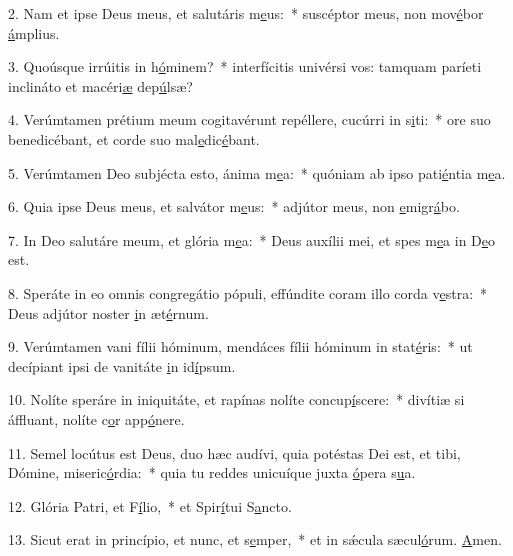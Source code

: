 2. Nam et ipse Deus meus, et salutáris m\uline{e}us:~* suscéptor meus, non mov\uline{é}bor \uline{á}mplius.\par 
3. Quoúsque irrúitis in h\uline{ó}minem?~* interfícitis univérsi vos: tamquam paríeti inclináto et macéri\uline{æ} dep\uline{ú}lsæ?\par 
4. Verúmtamen prétium meum cogitavérunt repéllere, cucúrri in s\uline{i}ti:~* ore suo benedicébant, et corde suo mal\uline{e}dic\uline{é}bant.\par 
5. Verúmtamen Deo subjécta esto, ánima m\uline{e}a:~* quóniam ab ipso pati\uline{é}ntia m\uline{e}a.\par 
6. Quia ipse Deus meus, et salvátor m\uline{e}us:~* adjútor meus, non \uline{e}migr\uline{á}bo.\par 
7. In Deo salutáre meum, et glória m\uline{e}a:~* Deus auxílii mei, et spes m\uline{e}a in D\uline{e}o est.\par 
8. Speráte in eo omnis congregátio pópuli, effúndite coram illo corda v\uline{e}stra:~* Deus adjútor noster \uline{i}n æt\uline{é}rnum.\par 
9. Verúmtamen vani fílii hóminum, mendáces fílii hóminum in stat\uline{é}ris:~* ut decípiant ipsi de vanitáte \uline{i}n id\uline{í}psum.\par 
10. Nolíte speráre in iniquitáte, et rapínas nolíte concup\uline{í}scere:~* divítiæ si áffluant, nolíte c\uline{o}r app\uline{ó}nere.\par 
11. Semel locútus est Deus, duo hæc audívi, quia potéstas Dei est, et tibi, Dómine, miseric\uline{ó}rdia:~* quia tu reddes unicuíque juxta \uline{ó}pera s\uline{u}a.\par 
12. Glória Patri, et F\uline{í}lio,~* et Spir\uline{í}tui S\uline{a}ncto.\par 
13. Sicut erat in princípio, et nunc, et s\uline{e}mper,~* et in sǽcula sæcul\uline{ó}rum. \uline{A}men.\par 

